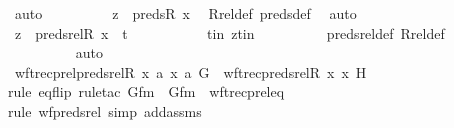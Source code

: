 \begin{isabellebody}
\ auto\isanewline
\ \ \ \ \ \ \isamarkupfalse%
\ \isamarkupfalse%
\ {\isachardoublequoteopen}z\ {\isasymin}\ preds{\isacharparenleft}{\kern0pt}R{\isacharcomma}{\kern0pt}\ x{\isacharparenright}{\kern0pt}{\isachardoublequoteclose}\ \isamarkupfalse%
\ Rrel{\isacharunderscore}{\kern0pt}def\ preds{\isacharunderscore}{\kern0pt}def\ \isamarkupfalse%
\ auto\isanewline
\ \ \ \ \ \ \isamarkupfalse%
\ \isamarkupfalse%
\ {\isachardoublequoteopen}z\ {\isasymin}\ preds{\isacharunderscore}{\kern0pt}rel{\isacharparenleft}{\kern0pt}R{\isacharcomma}{\kern0pt}\ x{\isacharparenright}{\kern0pt}\ {\isacharminus}{\kern0pt}{\isacharbackquote}{\kern0pt}{\isacharbackquote}{\kern0pt}\ {\isacharbraceleft}{\kern0pt}t{\isacharbraceright}{\kern0pt}{\isachardoublequoteclose}\ \isanewline
\ \ \ \ \ \ \ \ \isamarkupfalse%
\ tin\ ztin\isanewline
\ \ \ \ \ \ \ \ \isamarkupfalse%
\ preds{\isacharunderscore}{\kern0pt}rel{\isacharunderscore}{\kern0pt}def\ Rrel{\isacharunderscore}{\kern0pt}def\ \isanewline
\ \ \ \ \ \ \ \ \isamarkupfalse%
\ auto\isanewline
\ \ \ \ \isamarkupfalse%
\isanewline
\isanewline
\ \ \ \ \isamarkupfalse%
\ {\isachardoublequoteopen}wftrec{\isacharparenleft}{\kern0pt}prel{\isacharparenleft}{\kern0pt}preds{\isacharunderscore}{\kern0pt}rel{\isacharparenleft}{\kern0pt}R{\isacharcomma}{\kern0pt}\ x{\isacharparenright}{\kern0pt}{\isacharcomma}{\kern0pt}\ {\isacharbraceleft}{\kern0pt}a{\isacharbraceright}{\kern0pt}{\isacharparenright}{\kern0pt}{\isacharcomma}{\kern0pt}\ {\isasymlangle}x{\isacharcomma}{\kern0pt}\ a{\isasymrangle}{\isacharcomma}{\kern0pt}\ G{\isacharparenright}{\kern0pt}\ {\isacharequal}{\kern0pt}\ wftrec{\isacharparenleft}{\kern0pt}preds{\isacharunderscore}{\kern0pt}rel{\isacharparenleft}{\kern0pt}R{\isacharcomma}{\kern0pt}\ x{\isacharparenright}{\kern0pt}{\isacharcomma}{\kern0pt}\ x{\isacharcomma}{\kern0pt}\ H{\isacharparenright}{\kern0pt}{\isachardoublequoteclose}\ \ \isanewline
\ \ \ \ \ \ \isamarkupfalse%
{\isacharparenleft}{\kern0pt}rule\ eq{\isacharunderscore}{\kern0pt}flip{\isacharcomma}{\kern0pt}\ rule{\isacharunderscore}{\kern0pt}tac\ Gfm\ {\isacharequal}{\kern0pt}\ Gfm\ \ wftrec{\isacharunderscore}{\kern0pt}prel{\isacharunderscore}{\kern0pt}eq{\isacharparenright}{\kern0pt}\isanewline
\ \ \ \ \ \ \ \ \ \ \ \ \ \ \ \ \isamarkupfalse%
{\isacharparenleft}{\kern0pt}rule\ wf{\isacharunderscore}{\kern0pt}preds{\isacharunderscore}{\kern0pt}rel{\isacharcomma}{\kern0pt}\ simp\ add{\isacharcolon}{\kern0pt}assms{\isacharparenright}{\kern0pt}\isanewline

\end{isabellebody}
